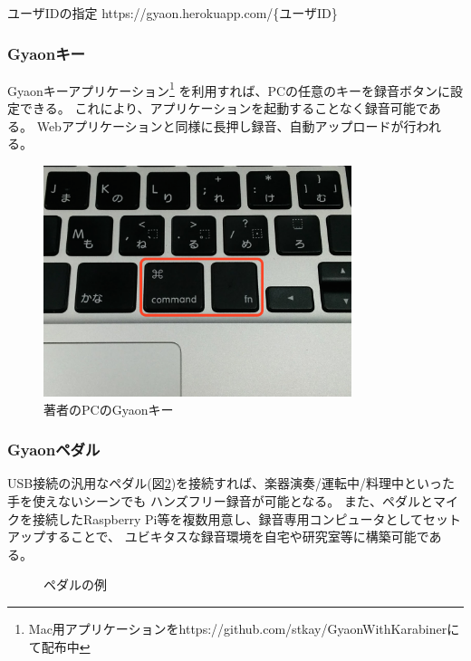 \begin{itembox}[l]
{ユーザIDの指定}
https://gyaon.herokuapp.com/\{ユーザID\}
\end{itembox}

\subsubsection{Gyaonキー}
Gyaonキーアプリケーション\footnote{\textsf{Mac用アプリケーションをhttps://github.com/stkay/GyaonWithKarabinerにて配布中}}
を利用すれば、PCの任意のキーを録音ボタンに設定できる。
これにより、アプリケーションを起動することなく録音可能である。
Webアプリケーションと同様に長押し録音、自動アップロードが行われる。

\begin{figure}[H]
\centering
\includegraphics[width=9cm]{images/key.png}
\caption{著者のPCのGyaonキー}
\label{key}
\end{figure}

\subsubsection{Gyaonペダル}
USB接続の汎用なペダル(図\ref{pedal})を接続すれば、楽器演奏/運転中/料理中といった手を使えないシーンでも
ハンズフリー録音が可能となる。
また、ペダルとマイクを接続したRaspberry Pi等を複数用意し、録音専用コンピュータとしてセットアップすることで、
ユビキタスな録音環境を自宅や研究室等に構築可能である。


\begin{figure}[H]
\centering
{}
\caption{ペダルの例}
\label{pedal}
\end{figure}

